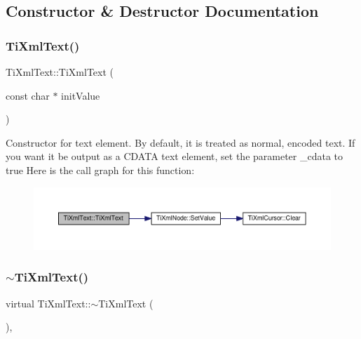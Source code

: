\subsection{Constructor \& Destructor Documentation}
\mbox{\label{class_ti_xml_text_af659e77c6b87d684827f35a8f4895960}} 
\subsubsection{\texorpdfstring{Ti\+Xml\+Text()}{TiXmlText()}\hspace{0.1cm}{\footnotesize\ttfamily [1/2]}}
{\footnotesize\ttfamily Ti\+Xml\+Text\+::\+Ti\+Xml\+Text (\begin{DoxyParamCaption}\item[{const char $\ast$}]{init\+Value }\end{DoxyParamCaption})\hspace{0.3cm}{\ttfamily [inline]}}

Constructor for text element. By default, it is treated as normal, encoded text. If you want it be output as a C\+D\+A\+TA text element, set the parameter \+\_\+cdata to \textquotesingle{}true\textquotesingle{} Here is the call graph for this function\+:
\nopagebreak
\begin{figure}[H]
\begin{center}
\leavevmode
\includegraphics[width=350pt]{class_ti_xml_text_af659e77c6b87d684827f35a8f4895960_cgraph}
\end{center}
\end{figure}
\mbox{\label{class_ti_xml_text_a829a4bd2d8d2461c333eb4f3f5b1b3d2}} 
\subsubsection{\texorpdfstring{$\sim$\+Ti\+Xml\+Text()}{~TiXmlText()}}
{\footnotesize\ttfamily virtual Ti\+Xml\+Text\+::$\sim$\+Ti\+Xml\+Text (\begin{DoxyParamCaption}{ }\end{DoxyParamCaption})\hspace{0.3cm}{\ttfamily [inline]}, {\ttfamily [virtual]}}

